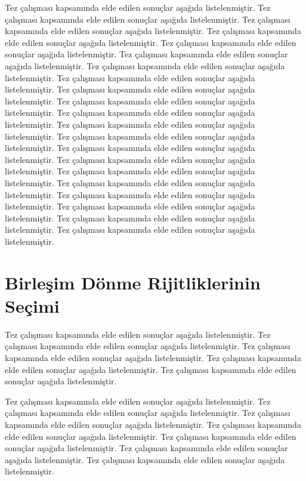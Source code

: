Tez çalışması kapsamında elde edilen sonuçlar aşağıda listelenmiştir.
Tez çalışması kapsamında elde edilen sonuçlar aşağıda listelenmiştir.
Tez çalışması kapsamında elde edilen sonuçlar aşağıda listelenmiştir.
Tez çalışması kapsamında elde edilen sonuçlar aşağıda listelenmiştir.
Tez çalışması kapsamında elde edilen sonuçlar aşağıda listelenmiştir.
Tez çalışması kapsamında elde edilen sonuçlar aşağıda listelenmiştir.
Tez çalışması kapsamında elde edilen sonuçlar aşağıda listelenmiştir.
Tez çalışması kapsamında elde edilen sonuçlar aşağıda listelenmiştir.
Tez çalışması kapsamında elde edilen sonuçlar aşağıda listelenmiştir.
Tez çalışması kapsamında elde edilen sonuçlar aşağıda listelenmiştir.
Tez çalışması kapsamında elde edilen sonuçlar aşağıda listelenmiştir.
Tez çalışması kapsamında elde edilen sonuçlar aşağıda listelenmiştir.
Tez çalışması kapsamında elde edilen sonuçlar aşağıda listelenmiştir.
Tez çalışması kapsamında elde edilen sonuçlar aşağıda listelenmiştir.
Tez çalışması kapsamında elde edilen sonuçlar aşağıda listelenmiştir.
Tez çalışması kapsamında elde edilen sonuçlar aşağıda listelenmiştir.
Tez çalışması kapsamında elde edilen sonuçlar aşağıda listelenmiştir.
Tez çalışması kapsamında elde edilen sonuçlar aşağıda listelenmiştir.
Tez çalışması kapsamında elde edilen sonuçlar aşağıda listelenmiştir.
Tez çalışması kapsamında elde edilen sonuçlar aşağıda listelenmiştir.
Tez çalışması kapsamında elde edilen sonuçlar aşağıda listelenmiştir. 

\section{Birleşim Dönme Rijitliklerinin Seçimi}

Tez çalışması kapsamında elde edilen sonuçlar aşağıda listelenmiştir.
Tez çalışması kapsamında elde edilen sonuçlar aşağıda listelenmiştir.
Tez çalışması kapsamında elde edilen sonuçlar aşağıda listelenmiştir.
Tez çalışması kapsamında elde edilen sonuçlar aşağıda listelenmiştir.
Tez çalışması kapsamında elde edilen sonuçlar aşağıda listelenmiştir. 

Tez çalışması kapsamında elde edilen sonuçlar aşağıda listelenmiştir.
Tez çalışması kapsamında elde edilen sonuçlar aşağıda listelenmiştir.
Tez çalışması kapsamında elde edilen sonuçlar aşağıda listelenmiştir.
Tez çalışması kapsamında elde edilen sonuçlar aşağıda listelenmiştir.
Tez çalışması kapsamında elde edilen sonuçlar aşağıda listelenmiştir.
Tez çalışması kapsamında elde edilen sonuçlar aşağıda listelenmiştir.
Tez çalışması kapsamında elde edilen sonuçlar aşağıda listelenmiştir. 
